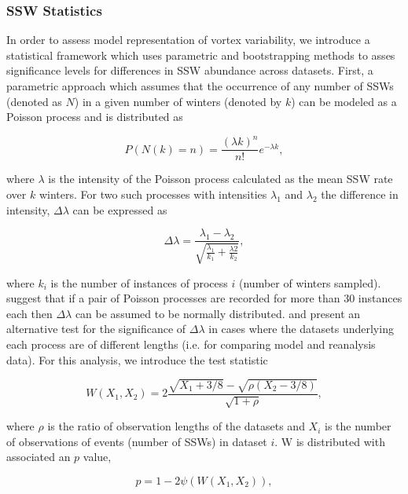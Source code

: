 \subsubsection*{SSW Statistics}
In order to assess model representation of vortex variability, we introduce a statistical framework which uses parametric and bootstrapping methods to asses significance levels for differences in SSW abundance across datasets. First, a parametric approach which assumes that the occurrence of any number of SSWs (denoted as $N$) in a given number of winters (denoted by $k$) can be modeled as a Poisson process and is distributed as 

\begin{equation} \label{Poisson}
P(N(k) = n) = \frac{(\lambda k)^n}{n!} e^{-\lambda k},
\end{equation}

where $\lambda$ is the intensity of the Poisson process calculated as the mean SSW rate over $k$ winters. For two such processes with intensities $\lambda_1$ and $\lambda_2$ the difference in intensity, $\Delta\lambda$ can be expressed as

\begin{equation} \label{Poisson}
\Delta\lambda = \frac{\lambda_1 - \lambda_2}{\sqrt{\frac{\lambda_1}{k_1} + \frac{\lambda2}{k_2}}},
\end{equation}

where $k_i$ is the number of instances of process $i$ (number of winters sampled). \cite{Charlton2007} suggest that if a pair of Poisson processes are recorded for more than 30 instances each then $\Delta\lambda$ can be assumed to be normally distributed. \cite{guTesting2008} and \cite{huffmanImproved1984} present an alternative test for the significance of $\Delta\lambda$ in cases where the datasets underlying each process are of different lengths (i.e. for comparing model and reanalysis data). For this analysis, we introduce the test statistic

\begin{equation} \label{deltalambda}
W(X_1, X_2) = 2 \frac{\sqrt{X_1 + 3/8} - \sqrt{\rho(X_2 - 3/8)}}
{\sqrt{1 + \rho}},
\end{equation}

where $\rho$ is the ratio of observation lengths of the datasets and $X_i$ is the number of observations of events (number of SSWs) in dataset $i$. W is distributed with associated an $p$ value, 

\begin{equation} \label{Pval}
p = 1-2\psi(W(X_1, X_2)),
\end{equation}

